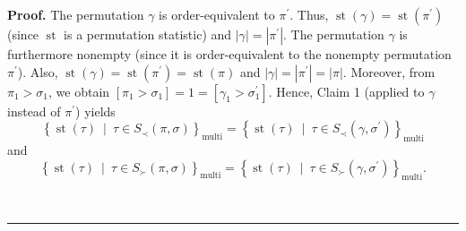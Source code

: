 \documentclass[numbers=enddot,12pt,final,onecolumn,notitlepage]{scrartcl}%
\theoremstyle{definition}
\newenvironment{proof}[1][Proof]{\noindent\textbf{#1.} }{\ \rule{0.5em}{0.5em}}
\newenvironment{verlong}{}{}
\begin{document}
\begin{verlong}
\begin{proof}
The permutation $\gamma$ is order-equivalent to $\pi^{\prime}$. Thus,
$\operatorname*{st}\left(  \gamma\right)  =\operatorname*{st}\left(
\pi^{\prime}\right)  $ (since $\operatorname*{st}$ is a permutation statistic)
and $\left\vert \gamma\right\vert =\left\vert \pi^{\prime}\right\vert $. The
permutation $\gamma$ is furthermore nonempty (since it is order-equivalent to
the nonempty permutation $\pi^{\prime}$). Also, $\operatorname*{st}\left(
\gamma\right)  =\operatorname*{st}\left(  \pi^{\prime}\right)
=\operatorname*{st}\left(  \pi\right)  $ and $\left\vert \gamma\right\vert
=\left\vert \pi^{\prime}\right\vert =\left\vert \pi\right\vert $. Moreover,
from $\pi_{1}>\sigma_{1}$, we obtain $\left[  \pi_{1}>\sigma_{1}\right]
=1=\left[  \gamma_{1}>\sigma_{1}^{\prime}\right]  $. Hence, Claim 1 (applied
to $\gamma$ instead of $\pi^{\prime}$) yields
\begin{equation}
\left\{  \operatorname*{st}\left(  \tau\right)  \ \mid\ \tau\in S_{\prec
}\left(  \pi,\sigma\right)  \right\}  _{\operatorname*{multi}}=\left\{
\operatorname*{st}\left(  \tau\right)  \ \mid\ \tau\in S_{\prec}\left(
\gamma,\sigma^{\prime}\right)  \right\}  _{\operatorname*{multi}}
\label{pf.lem.LRcomp.head-l2.c4.pf.5}%
\end{equation}
and%
\begin{equation}
\left\{  \operatorname*{st}\left(  \tau\right)  \ \mid\ \tau\in S_{\succ
}\left(  \pi,\sigma\right)  \right\}  _{\operatorname*{multi}}=\left\{
\operatorname*{st}\left(  \tau\right)  \ \mid\ \tau\in S_{\succ}\left(
\gamma,\sigma^{\prime}\right)  \right\}  _{\operatorname*{multi}}.
\label{pf.lem.LRcomp.head-l2.c4.pf.6}%
\end{equation}



\end{proof}
\end{verlong}
\end{document}
